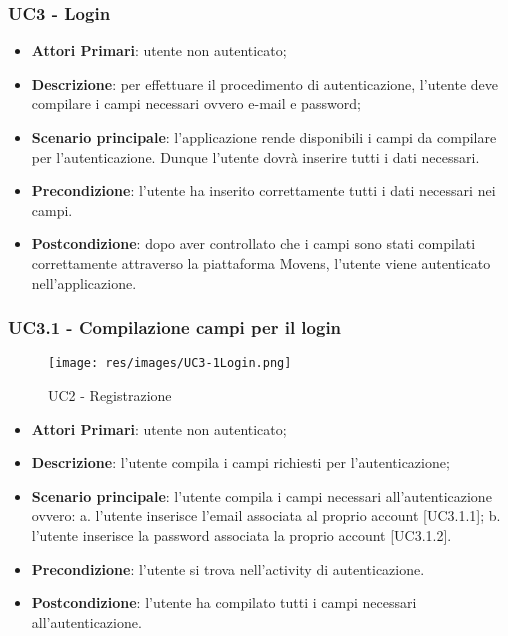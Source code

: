 \subsubsection{UC3 - Login}
\begin{itemize}
	\item \textbf{Attori Primari}: utente non autenticato;
	\item \textbf{Descrizione}: per effettuare il procedimento di autenticazione, l'utente deve compilare i campi necessari ovvero e-mail e password;
	\item \textbf{Scenario principale}: l'applicazione rende disponibili i campi da compilare per l'autenticazione. Dunque l'utente dovrà inserire tutti i dati necessari.
	
	\item \textbf{Precondizione}: l'utente ha inserito correttamente tutti i dati necessari nei campi.
	\item \textbf{Postcondizione}: dopo aver controllato che i campi sono stati compilati correttamente attraverso la piattaforma Movens, l'utente viene autenticato nell'applicazione.	
\end{itemize}

\subsubsection{UC3.1 - Compilazione campi per il login}
\begin{figure}[h]
	\texttt{[image: res/images/UC3-1Login.png]}
	\centering
	\caption{UC2 - Registrazione}
\end{figure}
\begin{itemize}
	\item \textbf{Attori Primari}: utente non autenticato;
	\item \textbf{Descrizione}: l'utente compila i campi richiesti per l'autenticazione;
	\item \textbf{Scenario principale}: l'utente compila i campi necessari all'autenticazione ovvero: 
	\newline
	a. l'utente inserisce l'email associata al proprio account [UC3.1.1];
	\newline
	b. l'utente inserisce la password associata la proprio account [UC3.1.2].	
	\item \textbf{Precondizione}: l'utente si trova nell'activity di autenticazione.
	\item \textbf{Postcondizione}: l'utente ha compilato tutti i campi necessari all'autenticazione.	
\end{itemize}


